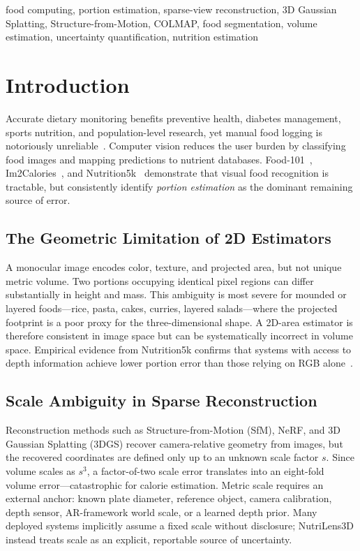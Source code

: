 \documentclass[conference]{IEEEtran}
\begin{document}
\begin{IEEEkeywords}
food computing, portion estimation, sparse-view reconstruction,
3D Gaussian Splatting, Structure-from-Motion, COLMAP, food segmentation,
volume estimation, uncertainty quantification, nutrition estimation
\end{IEEEkeywords}

\section{Introduction}

Accurate dietary monitoring benefits preventive health, diabetes management,
sports nutrition, and population-level research, yet manual food logging is
notoriously unreliable~\cite{meyers2015im2calories}. Computer vision reduces the
user burden by classifying food images and mapping predictions to nutrient
databases. Food-101~\cite{bossard2014food101}, Im2Calories~\cite{meyers2015im2calories},
and Nutrition5k~\cite{thames2021nutrition5k} demonstrate that visual food
recognition is tractable, but consistently identify \emph{portion estimation}
as the dominant remaining source of error.

\subsection{The Geometric Limitation of 2D Estimators}

A monocular image encodes color, texture, and projected area, but not unique
metric volume. Two portions occupying identical pixel regions can differ
substantially in height and mass. This ambiguity is most severe for mounded or
layered foods---rice, pasta, cakes, curries, layered salads---where the
projected footprint is a poor proxy for the three-dimensional shape. A 2D-area
estimator is therefore consistent in image space but can be systematically
incorrect in volume space. Empirical evidence from Nutrition5k confirms that
systems with access to depth information achieve lower portion error than those
relying on RGB alone~\cite{thames2021nutrition5k}.

\subsection{Scale Ambiguity in Sparse Reconstruction}

Reconstruction methods such as Structure-from-Motion (SfM), NeRF, and 3D
Gaussian Splatting (3DGS) recover camera-relative geometry from images, but
the recovered coordinates are defined only up to an unknown scale factor $s$.
Since volume scales as $s^3$, a factor-of-two scale error translates into an
eight-fold volume error---catastrophic for calorie estimation. Metric scale
requires an external anchor: known plate diameter, reference object, camera
calibration, depth sensor, AR-framework world scale, or a learned depth prior.
Many deployed systems implicitly assume a fixed scale without disclosure;
NutriLens3D instead treats scale as an explicit, reportable source of
uncertainty.
\end{document}
